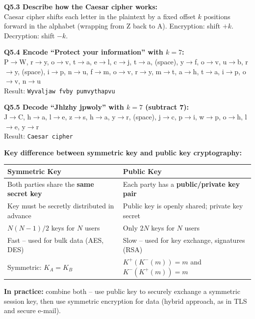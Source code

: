 \begin{tcolorbox}[exambox, title=S2025 Q5 -- Caesar Cipher -- Symmetric Key Cryptography]
\textbf{Q5.3 Describe how the Caesar cipher works:}\\
Caesar cipher shifts each letter in the plaintext by a fixed offset $k$ positions forward in the alphabet (wrapping from Z back to A). Encryption: shift $+k$. Decryption: shift $-k$.

\textbf{Q5.4 Encode ``Protect your information'' with $k=7$:}\\
P$\to$W, r$\to$y, o$\to$v, t$\to$a, e$\to$l, c$\to$j, t$\to$a, (space), y$\to$f, o$\to$v, u$\to$b, r$\to$y, (space), i$\to$p, n$\to$u, f$\to$m, o$\to$v, r$\to$y, m$\to$t, a$\to$h, t$\to$a, i$\to$p, o$\to$v, n$\to$u\\
Result: \texttt{Wyvaljaw fvby pumvythapvu}

\textbf{Q5.5 Decode ``Jhlzhy jpwoly'' with $k=7$ (subtract 7):}\\
J$\to$C, h$\to$a, l$\to$e, z$\to$s, h$\to$a, y$\to$r, (space), j$\to$c, p$\to$i, w$\to$p, o$\to$h, l$\to$e, y$\to$r\\
Result: \texttt{Caesar cipher}
\end{tcolorbox}

\begin{tcolorbox}[exambox, title=S2025 Q6 -- Symmetric vs.\ Public Key Systems]
\textbf{Key difference between symmetric key and public key cryptography:}

\begin{tabular}{p{5cm}p{6cm}}
\toprule
\textbf{Symmetric Key} & \textbf{Public Key} \\
\midrule
Both parties share the \textbf{same secret key} & Each party has a \textbf{public/private key pair} \\
Key must be secretly distributed in advance & Public key is openly shared; private key secret \\
$N(N-1)/2$ keys for $N$ users & Only $2N$ keys for $N$ users \\
Fast -- used for bulk data (AES, DES) & Slow -- used for key exchange, signatures (RSA) \\
Symmetric: $K_A = K_B$ & $K^+(K^-(m))=m$ and $K^-(K^+(m))=m$ \\
\bottomrule
\end{tabular}

\textbf{In practice:} combine both -- use public key to securely exchange a symmetric session key, then use symmetric encryption for data (hybrid approach, as in TLS and secure e-mail).
\end{tcolorbox}

